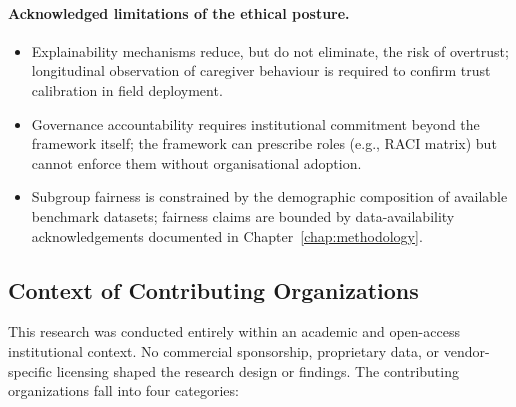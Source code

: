 \paragraph{Acknowledged limitations of the ethical posture.}
\begin{itemize}[leftmargin=*, itemsep=3pt]
    \item Explainability mechanisms reduce, but do not eliminate, the risk of overtrust; longitudinal observation of caregiver behaviour is required to confirm trust calibration in field deployment.
    \item Governance accountability requires institutional commitment beyond the framework itself; the framework can prescribe roles (e.g., RACI matrix) but cannot enforce them without organisational adoption.
    \item Subgroup fairness is constrained by the demographic composition of available benchmark datasets; fairness claims are bounded by data-availability acknowledgements documented in Chapter~\ref{chap:methodology}.
\end{itemize}

\subsection{Context of Contributing Organizations}
\label{sec:contributing_orgs}

This research was conducted entirely within an academic and open-access institutional context. No commercial sponsorship, proprietary data, or vendor-specific licensing shaped the research design or findings. The contributing organizations fall into four categories:

